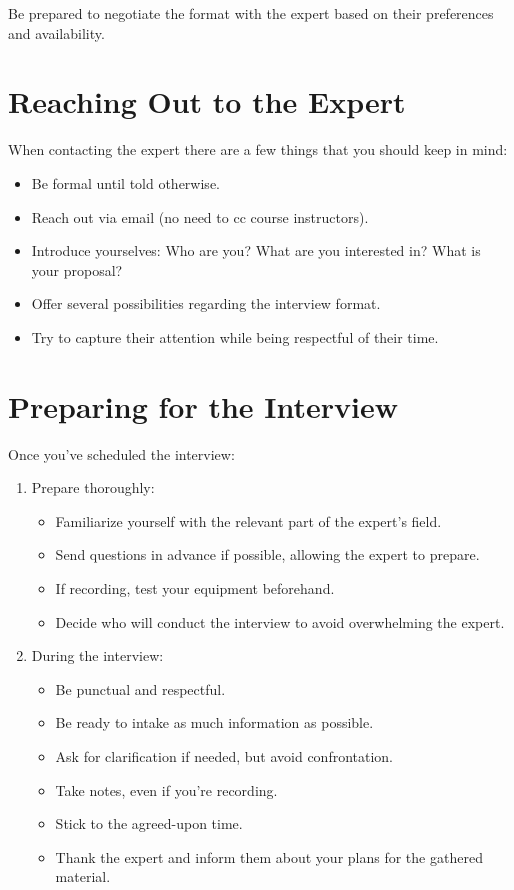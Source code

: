 \documentclass[
  letterpaper,
  DIV=11,
  numbers=noendperiod]{scrreprt}
\providecommand{\tightlist}{%
  \setlength{\itemsep}{0pt}\setlength{\parskip}{0pt}}\usepackage{longtable,booktabs,array}
\begin{document}
Be prepared to negotiate the format with the expert based on their
preferences and availability.

\section{Reaching Out to the Expert}\label{reaching-out-to-the-expert}

When contacting the expert there are a few things that you should keep
in mind:

\begin{itemize}
\tightlist
\item
  Be formal until told otherwise.
\item
  Reach out via email (no need to cc course instructors).
\item
  Introduce yourselves: Who are you? What are you interested in? What is
  your proposal?
\item
  Offer several possibilities regarding the interview format.
\item
  Try to capture their attention while being respectful of their time.
\end{itemize}

\section{Preparing for the Interview}\label{preparing-for-the-interview}

Once you've scheduled the interview:

\begin{enumerate}
\def\labelenumi{\arabic{enumi}.}
\tightlist
\item
  Prepare thoroughly:

  \begin{itemize}
  \tightlist
  \item
    Familiarize yourself with the relevant part of the expert's field.
  \item
    Send questions in advance if possible, allowing the expert to
    prepare.
  \item
    If recording, test your equipment beforehand.
  \item
    Decide who will conduct the interview to avoid overwhelming the
    expert.
  \end{itemize}
\item
  During the interview:

  \begin{itemize}
  \tightlist
  \item
    Be punctual and respectful.
  \item
    Be ready to intake as much information as possible.
  \item
    Ask for clarification if needed, but avoid confrontation.
  \item
    Take notes, even if you're recording.
  \item
    Stick to the agreed-upon time.
  \item
    Thank the expert and inform them about your plans for the gathered
    material.
  \end{itemize}
\end{enumerate}
\end{document}
